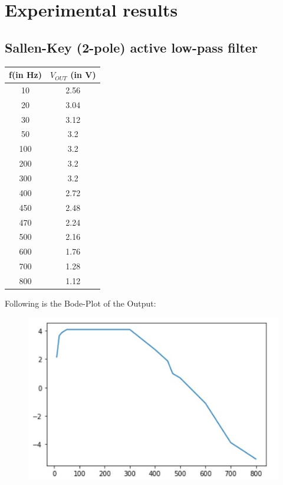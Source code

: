 \documentclass[12pt]{article}
\begin{document}
\section{Experimental results}

\subsection{ Sallen-Key (2-pole) active low-pass filter}
\begin{table}[H]
		\begin{center}
		
		\begin{tabular}{|c|c|}
			\hline
			\textbf{f(in Hz)} & \textbf{$V_{OUT}$ (in V)}\\
			\hline
			10 & 2.56\\
			\hline
			20 & 3.04\\
			\hline
                   30 & 3.12\\
			\hline
                   50 & 3.2\\
			\hline
                   100 & 3.2\\
			\hline
                   200 & 3.2\\
			\hline
300 & 3.2\\
			\hline
400 & 2.72\\
			\hline
450 & 2.48\\
			\hline
470 & 2.24\\
			\hline
500 & 2.16\\
			\hline
600 & 1.76\\
			\hline
700 & 1.28\\
			\hline
800 & 1.12\\
			\hline
            
		\end{tabular}
		\end{center}
\end{table}

Following is the Bode-Plot of the Output:
\begin{figure}[H]
\begin{center}
\includegraphics[scale = 0.8]{lowe.jpeg}
\end{center}
\end{figure}
\end{document}
